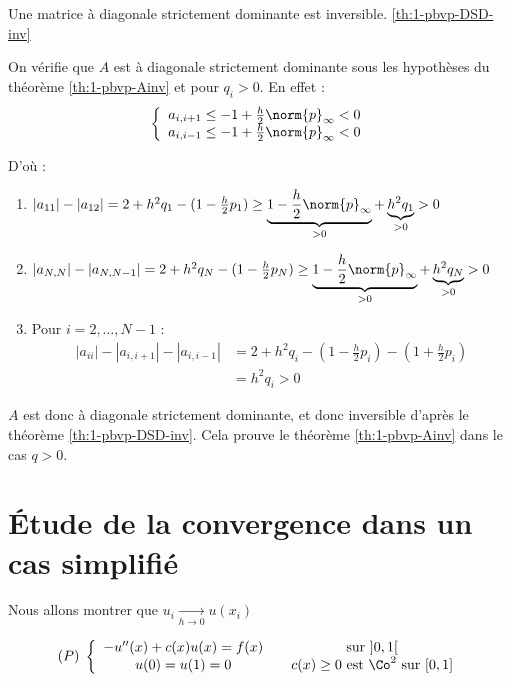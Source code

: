     \begin{ftheo}
        Une matrice à diagonale strictement dominante est inversible.
        \ref{th:1-pbvp-DSD-inv}
    \end{ftheo}

    On vérifie que $A$ est à diagonale strictement dominante sous les hypothèses
    du théorème \ref{th:1-pbvp-Ainv} et pour $q_i>0$. En effet :
    \[
        \left\lbrace
        \begin{array}{c}
            a_{i,i+1} \leq -1 + \frac{h}{2} \norm{p}_\infty < 0 \\
            a_{i,i-1} \leq -1 + \frac{h}{2} \norm{p}_\infty < 0
        \end{array}
        \right.
    \]

    D'où :
    \begin{enumerate}[label=*]
        \item $|a_{11}| - |a_{12}| = 2 + h^2 q_1 - (1 - \frac{h}{2}p_1) \geq
            \underbrace{1 - \frac{h}{2} \norm{p}_\infty}_{>0} + \underbrace{h^2 q_1}_{>0} > 0 $

        \item $|a_{N,N}| - |a_{N,N-1}| = 2 + h^2 q_N - (1 - \frac{h}{2}p_N) \geq
            \underbrace{1 - \frac{h}{2} \norm{p}_\infty}_{>0} + \underbrace{h^2 q_N}_{>0} > 0 $

        \item Pour $i = 2, \dots, N-1$ :
            \begin{align*}
                |a_{ii}| - |a_{i,i+1}| - |a_{i,i-1}| & = 2 + h^2 q_i - (1-\frac{h}{2}p_i) - (1 + \frac{h}{2}p_i) \\
                & = h^2 q_i > 0
            \end{align*}
    \end{enumerate}

    $A$ est donc à diagonale strictement dominante, et donc inversible d'après
    le théorème \ref{th:1-pbvp-DSD-inv}. Cela prouve le théorème \ref{th:1-pbvp-Ainv} dans le cas $q > 0$.

\section{Étude de la convergence dans un cas simplifié}
Nous allons montrer que $u_i \underset{h\to0}{\longrightarrow} u(x_i)$

\[
    (P) \;
    \left\lbrace
    \begin{array}{ccc}
        -u''(x) + c(x) u(x) = f(x) & & \text{sur } ]0,1[ \\
            u(0) = u(1) = 0 & & c(x) \geq 0 \text{ est $\Co^2$ sur $[0,1]$}
    \end{array}
    \right.
\]

